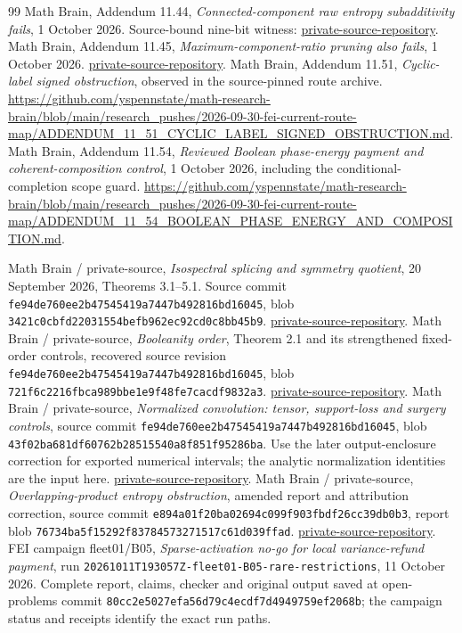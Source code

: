 \documentclass[11pt]{article}
\begin{document}
\begin{thebibliography}{99}
 Math Brain, Addendum 11.44, \emph{Connected-component raw entropy subadditivity fails}, 1 October 2026. Source-bound nine-bit witness: \url{private-source-repository}.
 Math Brain, Addendum 11.45, \emph{Maximum-component-ratio pruning also fails}, 1 October 2026. \url{private-source-repository}.
 Math Brain, Addendum 11.51, \emph{Cyclic-label signed obstruction}, observed in the source-pinned route archive. \url{https://github.com/yspennstate/math-research-brain/blob/main/research_pushes/2026-09-30-fei-current-route-map/ADDENDUM_11_51_CYCLIC_LABEL_SIGNED_OBSTRUCTION.md}.
 Math Brain, Addendum 11.54, \emph{Reviewed Boolean phase-energy payment and coherent-composition control}, 1 October 2026, including the conditional-completion scope guard. \url{https://github.com/yspennstate/math-research-brain/blob/main/research_pushes/2026-09-30-fei-current-route-map/ADDENDUM_11_54_BOOLEAN_PHASE_ENERGY_AND_COMPOSITION.md}.

 Math Brain / private-source,
\emph{Isospectral splicing and symmetry quotient},
20 September 2026, Theorems 3.1--5.1.
Source commit \texttt{fe94de760ee2b47545419a7447b492816bd16045},
blob \texttt{3421c0cbfd22031554befb962ec92cd0c8bb45b9}.
\url{private-source-repository}.
 Math Brain / private-source,
\emph{Booleanity order}, Theorem 2.1 and its strengthened
fixed-order controls, recovered source revision
\texttt{fe94de760ee2b47545419a7447b492816bd16045},
blob \texttt{721f6c2216fbca989bbe1e9f48fe7cacdf9832a3}.
\url{private-source-repository}.
 Math Brain / private-source,
\emph{Normalized convolution: tensor, support-loss and surgery controls},
source commit \texttt{fe94de760ee2b47545419a7447b492816bd16045},
blob \texttt{43f02ba681df60762b28515540a8f851f95286ba}.
Use the later output-enclosure correction for exported numerical
intervals; the analytic normalization identities are the input here.
\url{private-source-repository}.
 Math Brain / private-source,
\emph{Overlapping-product entropy obstruction}, amended report
and attribution correction, source commit
\texttt{e894a01f20ba02694c099f903fbdf26cc39db0b3},
report blob \texttt{76734ba5f15292f83784573271517c61d039ffad}.
\url{private-source-repository}.
 FEI campaign fleet01/B05,
\emph{Sparse-activation no-go for local variance-refund payment},
run \texttt{20261011T193057Z-fleet01-B05-rare-restrictions},
11 October 2026. Complete report, claims, checker and original
output saved at open-problems commit
\texttt{80cc2e5027efa56d79c4ecdf7d4949759ef2068b};
the campaign status and receipts identify the exact run paths.

\end{thebibliography}
\end{document}
